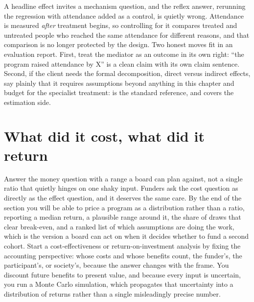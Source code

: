 \begin{kaobox}[frametitle=When the next question is \enquote{did it work \emph{through} attendance?}]
A headline effect invites a mechanism question, and the reflex answer, rerunning the regression with attendance added as a control, is quietly wrong. Attendance is measured \emph{after} treatment begins, so controlling for it compares treated and untreated people who reached the same attendance for different reasons, and that comparison is no longer protected by the design. Two honest moves fit in an evaluation report. First, treat the mediator as an outcome in its own right: \enquote{the program raised attendance by X} is a clean claim with its own claim sentence. Second, if the client needs the formal decomposition, direct versus indirect effects, say plainly that it requires assumptions beyond anything in this chapter and budget for the specialist treatment: \textcite{vanderweele2015explanation} is the standard reference, and \textcite{huber2023causal} covers the estimation side.
\end{kaobox}

\section{What did it cost, what did it return}\label{sec:roi}
Answer the money question with a range a board can plan against, not a single ratio that quietly hinges on one shaky input. Funders ask the cost question as directly as the effect question, and it deserves the same care. By the end of the section you will be able to price a program as a distribution rather than a ratio, reporting a median return, a plausible range around it, the share of draws that clear break-even, and a ranked list of which assumptions are doing the work, which is the version a board can act on when it decides whether to fund a second cohort. Start a cost-effectiveness or return-on-investment analysis by fixing the accounting perspective: whose costs and whose benefits count, the funder's, the participant's, or society's, because the answer changes with the frame. You discount future benefits to present value, and because every input is uncertain, you run a Monte Carlo simulation, which propagates that uncertainty into a distribution of returns rather than a single misleadingly precise number.

